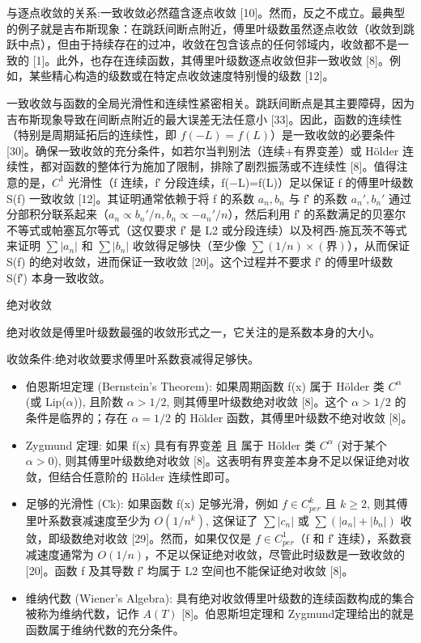 与逐点收敛的关系:一致收敛必然蕴含逐点收敛 [10]。然而，反之不成立。最典型的例子就是吉布斯现象：在跳跃间断点附近，傅里叶级数虽然逐点收敛（收敛到跳跃中点），但由于持续存在的过冲，收敛在包含该点的任何邻域内，收敛都不是一致的 [1]。此外，也存在连续函数，其傅里叶级数逐点收敛但非一致收敛 [8]。例如，某些精心构造的级数或在特定点收敛速度特别慢的级数 [12]。

一致收敛与函数的全局光滑性和连续性紧密相关。跳跃间断点是其主要障碍，因为吉布斯现象导致在间断点附近的最大误差无法任意小 [33]。因此，函数的连续性（特别是周期延拓后的连续性，即 $f(−L)=f(L)$）是一致收敛的必要条件 [30]。确保一致收敛的充分条件，如若尔当判别法（连续+有界变差）或 Hölder 连续性，都对函数的整体行为施加了限制，排除了剧烈振荡或不连续性 [8]。值得注意的是，$C^1$ 光滑性（f 连续，f′ 分段连续，f(−L)=f(L)）足以保证 f 的傅里叶级数 S(f) 一致收敛 [12]。其证明通常依赖于将 f 的系数 $a_n,b_n$ 与 f′ 的系数 $a_n',b_n'$ 通过分部积分联系起来（$a_n\propto b_n'/n,b_n\propto -a_n'/n$），然后利用 f′ 的系数满足的贝塞尔不等式或帕塞瓦尔等式（这仅要求 f′ 是 L2 或分段连续）以及柯西-施瓦茨不等式来证明 $\sum|a_n|$ 和 $\sum|b_n|$ 收敛得足够快（至少像 $\sum(1/n)\times(界)$），从而保证 S(f) 的绝对收敛，进而保证一致收敛 [20]。这个过程并不要求 f′ 的傅里叶级数 S(f′) 本身一致收敛。

绝对收敛

绝对收敛是傅里叶级数最强的收敛形式之一，它关注的是系数本身的大小。

收敛条件:绝对收敛要求傅里叶系数衰减得足够快。

\begin{itemize}
	\item 伯恩斯坦定理 (Bernstein's Theorem): 如果周期函数 f(x) 属于 Hölder 类 $C^\alpha$ (或 Lip($\alpha$)), 且阶数 $\alpha>1/2$, 则其傅里叶级数绝对收敛 [8]。这个 $\alpha>1/2$ 的条件是临界的；存在 $\alpha=1/2$ 的 Hölder 函数，其傅里叶级数不绝对收敛 [8]。
	\item Zygmund 定理: 如果 f(x) 具有有界变差 且 属于 Hölder 类 $C^\alpha$ (对于某个 $\alpha>0$), 则其傅里叶级数绝对收敛 [8]。这表明有界变差本身不足以保证绝对收敛，但结合任意阶的 Hölder 连续性即可。
	\item 足够的光滑性 (Ck): 如果函数 f(x) 足够光滑，例如 $f\in C_{per}^k$ 且 $k\geq 2$, 则其傅里叶系数衰减速度至少为 $O(1/n^k)$, 这保证了 $\sum|c_n|$ 或 $\sum(|a_n|+|b_n|)$ 收敛，即级数绝对收敛 [29]。然而，如果仅仅是 $f\in C_{per}^1$（f 和 f′ 连续），系数衰减速度通常为 $O(1/n)$，不足以保证绝对收敛，尽管此时级数是一致收敛的 [20]。函数 f 及其导数 f′ 均属于 L2 空间也不能保证绝对收敛 [8]。
	\item 维纳代数 (Wiener's Algebra): 具有绝对收敛傅里叶级数的连续函数构成的集合被称为维纳代数，记作 $A (T)$ [8]。伯恩斯坦定理和 Zygmund定理给出的就是函数属于维纳代数的充分条件。
\end{itemize}

